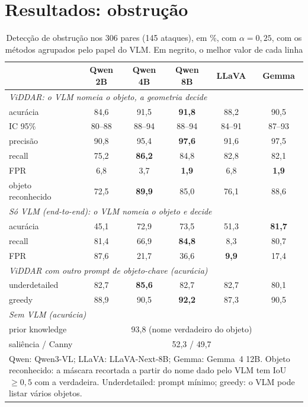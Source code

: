 \documentclass[conference]{IEEEtran}
\begin{document}
\section{Resultados: obstrução}
\label{sec:res-obs}

\begin{table}[!t]
\renewcommand{\arraystretch}{1.05}
\caption{Detecção de obstrução nos 306 pares (145 ataques), em \%, com $\alpha=0{,}25$, com os métodos
agrupados pelo papel do VLM. Em negrito, o melhor valor de cada linha}
\label{tab:obs}
\centering
\footnotesize
\setlength{\tabcolsep}{3.2pt}
\begin{tabular}{lccccc}
\toprule
 & Qwen 2B & Qwen 4B & Qwen 8B & LLaVA & Gemma \\
\midrule
\multicolumn{6}{l}{\textit{ViDDAR: o VLM nomeia o objeto, a geometria decide}} \\
\quad acurácia & 84,6 & 91,5 & \textbf{91,8} & 88,2 & 90,5 \\
\quad \scriptsize IC 95\% & \scriptsize 80--88 & \scriptsize 88--94 & \scriptsize 88--94 & \scriptsize 84--91 & \scriptsize 87--93 \\
\quad precisão & 90,8 & 95,4 & \textbf{97,6} & 91,6 & 97,5 \\
\quad recall & 75,2 & \textbf{86,2} & 84,8 & 82,8 & 82,1 \\
\quad FPR & 6,8 & 3,7 & \textbf{1,9} & 6,8 & \textbf{1,9} \\
\quad objeto reconhecido & 72,5 & \textbf{89,9} & 85,0 & 76,1 & 88,6 \\
\midrule
\multicolumn{6}{l}{\textit{Só VLM (end-to-end): o VLM nomeia o objeto e decide}} \\
\quad acurácia & 45,1 & 72,9 & 73,5 & 51,3 & \textbf{81,7} \\
\quad recall & 81,4 & 66,9 & \textbf{84,8} & 8,3 & 80,7 \\
\quad FPR & 87,6 & 21,7 & 36,6 & \textbf{9,9} & 17,4 \\
\midrule
\multicolumn{6}{l}{\textit{ViDDAR com outro prompt de objeto-chave (acurácia)}} \\
\quad underdetailed & 82,7 & \textbf{85,6} & 82,7 & 82,7 & 80,1 \\
\quad greedy & 88,9 & 90,5 & \textbf{92,2} & 87,3 & 90,5 \\
\midrule
\multicolumn{6}{l}{\textit{Sem VLM (acurácia)}} \\
\quad prior knowledge & \multicolumn{5}{c}{93,8 (nome verdadeiro do objeto)} \\
\quad saliência / Canny & \multicolumn{5}{c}{52,3 / 49,7} \\
\bottomrule
\multicolumn{6}{L{8.2cm}}{\scriptsize Qwen: Qwen3-VL; LLaVA: LLaVA-Next-8B; Gemma: Gemma~4 12B.
Objeto reconhecido: a máscara recortada a partir do nome dado pelo VLM tem IoU $\geq 0{,}5$ com a
verdadeira. Underdetailed: prompt mínimo; greedy: o VLM pode listar vários objetos.}
\end{tabular}
\end{table}
\end{document}
